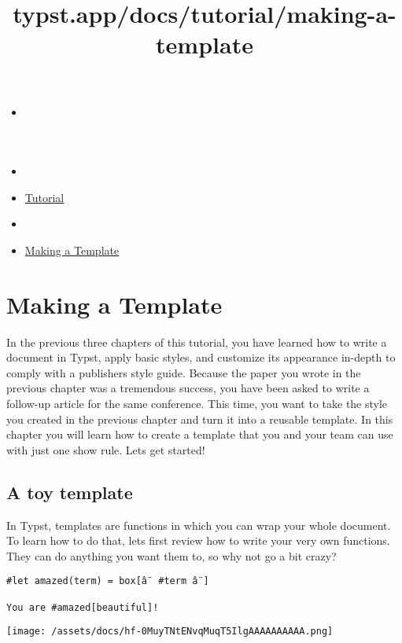\title{typst.app/docs/tutorial/making-a-template}

\begin{itemize}
\tightlist
\item
  \href{/docs}{}
\item
  
\item
  \href{/docs/tutorial/}{Tutorial}
\item
  
\item
  \href{/docs/tutorial/making-a-template/}{Making a Template}
\end{itemize}

\section{Making a Template}\label{making-a-template}

In the previous three chapters of this tutorial, you have learned how to
write a document in Typst, apply basic styles, and customize its
appearance in-depth to comply with a publisher\textquotesingle s style
guide. Because the paper you wrote in the previous chapter was a
tremendous success, you have been asked to write a follow-up article for
the same conference. This time, you want to take the style you created
in the previous chapter and turn it into a reusable template. In this
chapter you will learn how to create a template that you and your team
can use with just one show rule. Let\textquotesingle s get started!

\subsection{A toy template}\label{toy-template}

In Typst, templates are functions in which you can wrap your whole
document. To learn how to do that, let\textquotesingle s first review
how to write your very own functions. They can do anything you want them
to, so why not go a bit crazy?

\begin{verbatim}
#let amazed(term) = box[â¨ #term â¨]

You are #amazed[beautiful]!
\end{verbatim}

\texttt{[image: /assets/docs/hf-0MuyTNtENvqMuqT5IlgAAAAAAAAAA.png]}

